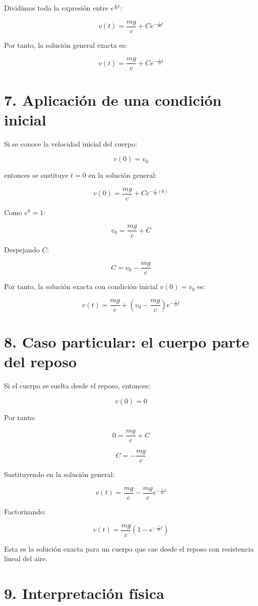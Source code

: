\documentclass[12pt,letterpaper]{article}
\begin{document}
Dividimos toda la expresión entre \(e^{\frac{c}{m}t}\):

\[
v(t)=\frac{mg}{c}+Ce^{-\frac{c}{m}t}
\]

Por tanto, la solución general exacta es:

\[
\boxed{v(t)=\frac{mg}{c}+Ce^{-\frac{c}{m}t}}
\]

\section*{7. Aplicación de una condición inicial}

Si se conoce la velocidad inicial del cuerpo:

\[
v(0)=v_0
\]

entonces se sustituye \(t=0\) en la solución general:

\[
v(0)=\frac{mg}{c}+Ce^{-\frac{c}{m}(0)}
\]

Como \(e^0=1\):

\[
v_0=\frac{mg}{c}+C
\]

Despejando \(C\):

\[
C=v_0-\frac{mg}{c}
\]

Por tanto, la solución exacta con condición inicial \(v(0)=v_0\) es:

\[
\boxed{v(t)=\frac{mg}{c}+\left(v_0-\frac{mg}{c}\right)e^{-\frac{c}{m}t}}
\]

\section*{8. Caso particular: el cuerpo parte del reposo}

Si el cuerpo se suelta desde el reposo, entonces:

\[
v(0)=0
\]

Por tanto:

\[
0=\frac{mg}{c}+C
\]

\[
C=-\frac{mg}{c}
\]

Sustituyendo en la solución general:

\[
v(t)=\frac{mg}{c}-\frac{mg}{c}e^{-\frac{c}{m}t}
\]

Factorizando:

\[
\boxed{v(t)=\frac{mg}{c}\left(1-e^{-\frac{c}{m}t}\right)}
\]

Esta es la solución exacta para un cuerpo que cae desde el reposo con resistencia lineal del aire.

\section*{9. Interpretación física}
\end{document}
